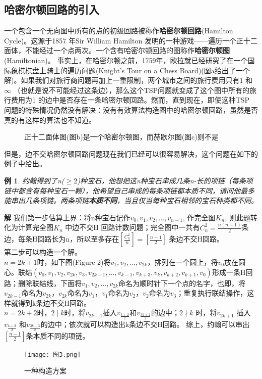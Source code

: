 \documentclass[11pt,a4paper,openany]{book}
\newtheorem{sample}{\textbf{例}}[section]
\begin{document}
\subsection{哈密尔顿回路的引入} 一个包含一个无向图中所有的点的初级回路被称作\textbf{哈密尔顿回路}(Hamilton Cycle)。这源于1857 年Sir William Hamilton 发明的一种游戏——遍历一个正十二面体，不能经过一个点两次。一个含有哈密尔顿回路的图称作\textbf{哈密尔顿图}(Hamiltonian)。 事实上，在哈密尔顿之前，1759年，欧拉就已经研究了在一个国际象棋棋盘上骑士的遍历问题(Knight's Tour on a Chess Board)(图a给出了一个解)。如果我们对旅行商问题再加上一重限制，两个城市之间的旅行费用只有$1$ 和$\infty$ （也就是说不可能经过这条边），那么这个TSP问题就变成了这个图中所有的旅行费用为1 的边中是否存在一条哈密尔顿回路。然而，直到现在，即使这种TSP 问题的特殊情况仍然没有解决：没有有效算法构造图中的哈密尔顿回路，虽然是否真的有这样的算法也不知道。\\
\begin{figure}[H]
\centering
{}
\caption{正十二面体图(图b)是一个哈密尔顿图，而赫歇尔图(图c)则不是}
\label{Fig.lable}
\end{figure}
但是，边不交哈密尔顿回路问题现在我们已经可以很容易解决，这个问题在如下的例子中给出。\\
\begin{sample} {\K 约翰得到了n($\geq 2$)种宝石，他想把这n种宝石串成几条n-长的项链（每条项链中都含有每种宝石一颗），他希望自己串成的每条项链都本质不同，请问他最多能串出几条项链。两条项链\textbf{本质不同}，当且仅当每种宝石相邻的宝石种类都不同。}\end{sample}
\textbf{解} 我们第一步估算上界：将n种宝石记作$v_0,v_1,v_2,\dots,v_{n-1}$, 作完全图$K_n$, 则此题转化为计算完全图$K_n$ 中边不交H 回路计数问题；完全图中一共有$C_{n}^{2}=\frac{n(n-1)}{2}$条边，每条H回路长为n，所以至多存在$[\frac{C_n^2}{n}]=[\frac{n-1}{2}]$ 条边不交H回路。
\\第二步可以构造一个解。\\
$n=2k+1$时，如下图(Figure 2)将$v_1,v_2,\dots,v_{2k}$，排列在一个圆上，将$v_0$放在圆心。联结$(v_0,v_1,v_2,v_{2k},v_3,v_{2k-1},\dots,v_{k-1},v_{k+3},v_{k},v_{k+2},v_{k+1},v_0)$形成一条H回路；删除联结线，下面将$v_1,v_2,\dots,v_{2k}$命名为顺时针下一个点的名字，也即，将$v_{2k-1}$命名为$v_{2k}$，$v_{2k}$命名为$v_1$，$v_1$命名为$v_2$，$v_2$命名为$v_3$；重复执行联结操作，这样就得到k条边不交H回路。\\
$n=2k+2$时，$2\mid k$时，将$v_{2k+1}$插入$v_{\frac{k+2}{2}}$和$v_{\frac{3k+2}{2}}$的边中；$2 \nmid k$ 时，将$v_{2k+1}$ 插入$v_{\frac{k+3}{2}}$ 和$v_{\frac{3k+3}{2}}$的边中；依次就可以构造出k条边不交H回路。
综上，约翰可以串出$[\frac{n-1}{2}]$条本质不同的项链。
\begin{figure}[h]
 \centering
  \texttt{[image: 图3.png]}
  \caption{一种构造方案}\label{Fig.label}
\end{figure}
\end{document}
